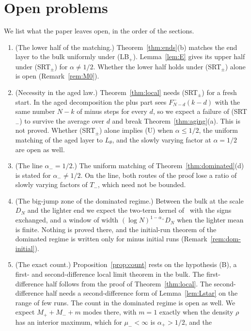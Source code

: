 \section{Open problems}\label{sec:open}

We list what the paper leaves open, in the order of the sections.
\begin{enumerate}[(1)]
\item (The lower half of the matching.) Theorem~\ref{thm:ends}(b) matches the end layer to the
bulk uniformly under (LB$_\plus$). Lemma~\ref{lem:E} gives its upper half under (SRT$_\pm$) for
$\alpha\ne1/2$. Whether the lower half holds under (SRT$_\pm$) alone is open
(Remark~\ref{rem:M0}).
\item (Necessity in the aged law.) Theorem~\ref{thm:local} needs (SRT$_\pm$) for a fresh start.
In the aged decomposition the plus part sees $F^\minus_{N-d}(k-d)$ with the same number
$N-k$ of minus steps for every $d$, so we expect a failure of (SRT$_\minus$) to survive the
average over $d$ and break Theorem~\ref{thm:aging}(a). This is not proved. Whether (SRT$_\pm$)
alone implies (U) when $\alpha\le1/2$, the uniform matching of the aged layer to $L_\theta$,
and the slowly varying factor at $\alpha=1/2$ are open as well.
\item (The line $\alpha_\minus=1/2$.) The uniform matching of Theorem~\ref{thm:dominated}(d) is
stated for $\alpha_\minus\ne1/2$. On the line, both routes of the proof lose a ratio of slowly
varying factors of $T_\minus$, which need not be bounded.
\item (The big-jump zone of the dominated regime.) Between the bulk at the scale $D_N$ and the
lighter end we expect the two-term kernel of~\cite{paperF} with the signs exchanged, and a
window of width $(\log N)^{1-\alpha_\plus}D_N$ when the lighter mean is finite. Nothing is proved
there, and the initial-run theorem of the dominated regime is written only for minus initial
runs (Remark~\ref{rem:dom-initial}).
\item (The exact count.) Proposition~\ref{prop:count} rests on the hypothesis (B), a
first- and second-difference local limit theorem in the bulk. The first-difference half follows
from the proof of Theorem~\ref{thm:local}. The second-difference half needs a second-difference
form of Lemma~\ref{lem:Lstar} on the range of few runs. The count in the dominated regime
is open as well. We expect $M_\plus+M_\minus+m$ modes there, with $m=1$ exactly when the density
$\rho$ has an interior maximum, which for $\mu_\minus<\infty$ is $\alpha_\plus>1/2$, and the

\end{enumerate}
